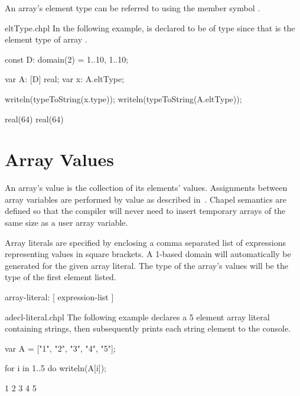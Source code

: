 %
%
An array's element type can be referred to using the member symbol
.

\begin{chapelexample}{eltType.chpl}
In the following example,  is declared to be of type
 since that is the element type of array .
\begin{chapelpre}
const D: domain(2) = {1..10, 1..10};
\end{chapelpre}
\begin{chapel}
var A: [D] real;
var x: A.eltType;
\end{chapel}
\begin{chapelpost}
writeln(typeToString(x.type));
writeln(typeToString(A.eltType));
\end{chapelpost}
\begin{chapeloutput}
real(64)
real(64)
\end{chapeloutput}
\end{chapelexample}

\section{Array Values}
\label{Array_Values}

An array's value is the collection of its elements' values.
Assignments between array variables are performed by value as
described in~.  Chapel semantics are defined so
that the compiler will never need to insert temporary arrays of the
same size as a user array variable.


Array literals are specified by enclosing a comma separated list of expressions
representing values in square brackets. A 1-based domain will automatically be 
generated for the given array literal.  The type of the array's values will be 
the type of the first element listed.

\begin{syntax}
array-literal:
  [ expression-list ]
\end{syntax}

\begin{chapelexample}{adecl-literal.chpl}
The following example declares a 5 element array literal containing strings,
then subsequently prints each string element to the console.
\begin{chapel}
var A = ["1", "2", "3", "4", "5"];

for i in 1..5 do
  writeln(A[i]);
\end{chapel}
\begin{chapeloutput}
1
2
3
4
5
\end{chapeloutput}
\end{chapelexample}

